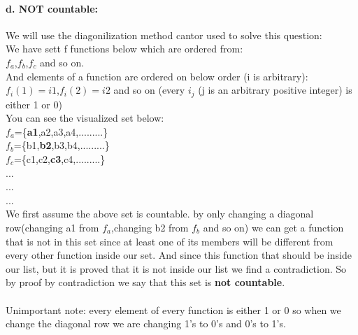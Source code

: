\documentclass[11pt]{article}
\begin{document}
\paragraph{d. NOT countable:}
We will use the diagonilization method cantor used to solve this question:\\
We have sett f functions below which are ordered from:\\
$f_a$,$f_b$,$f_c$ and so on.\\
And elements of a function are ordered on below order (i is arbitrary):\\ 
$f_i(1)=i1$,$f_i(2)=i2$ and so on (every $i_j$ (j is an arbitrary positive integer) is either 1 or 0)\\
You can see the visualized set below:\\
$f_a$=\{\textbf{a1},a2,a3,a4,.........\}\\
$f_b$=\{b1,\textbf{b2},b3,b4,.........\}\\
$f_c$=\{c1,c2,\textbf{c3},c4,.........\}\\
...\\
...\\
...\\
We first assume the above set is countable. by only changing a diagonal row(changing a1 from $f_a$,changing b2 from $f_b$ and so on) we can get a function that is not in this set since at least one of its members will be different from every other function inside our set. And since this function that should be inside our list, but it is proved that it is not inside our list we find a contradiction. So by proof by contradiction we say that this set is \textbf{not countable}.\\ \\
Unimportant note: every element of every function is either 1 or 0 so when we change the diagonal row we are changing 1's to 0's and 0's to 1's.
\end{document}

